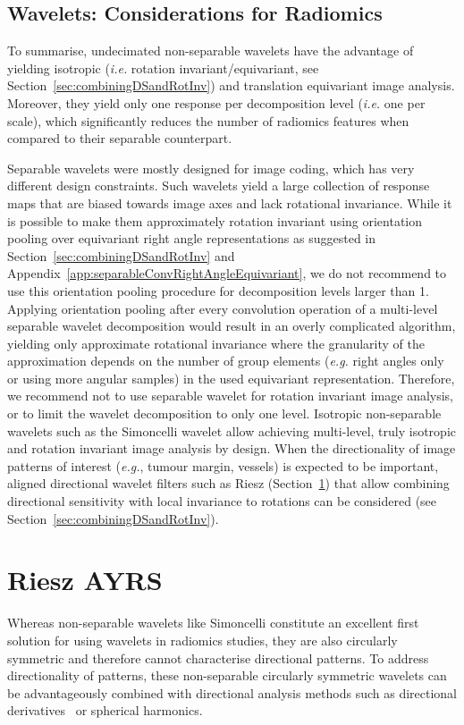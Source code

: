 \documentclass[fleqn,a4paper,oneside,openany]{book}
\newcommand\id[1]{{\hfill\normalsize{\idfont #1}}}
\renewcommand{\marginnote}[2][]{}
\begin{document}
\subsection{Wavelets: Considerations for Radiomics}\label{sec:waveletConsiderations}
%
To summarise, undecimated non-separable wavelets have the advantage of yielding isotropic (\textit{i.e.} rotation invariant/equivariant, see Section~\ref{sec:combiningDSandRotInv}) and translation equivariant image analysis. Moreover, they yield only one response per decomposition level (\textit{i.e.} one per scale), which significantly reduces the number of radiomics features when compared to their separable counterpart.
%
\marginnote{\footnotesize v4: Added recommendation to not perform decomposition using separable wavelets beyond the first level.}
Separable wavelets were mostly designed for image coding, which has very different design constraints.
Such wavelets yield a large collection of response maps that are biased towards image axes and lack rotational invariance.
While it is possible to make them approximately rotation invariant using orientation pooling over equivariant right angle representations as suggested in Section~\ref{sec:combiningDSandRotInv} and Appendix~\ref{app:separableConvRightAngleEquivariant}, we do not recommend to use this orientation pooling procedure for decomposition levels larger than 1.
Applying orientation pooling after every convolution operation of a multi-level separable wavelet decomposition would result in an overly complicated algorithm, yielding only approximate rotational invariance where the granularity of the approximation depends on the number of group elements (\emph{e.g.} right angles only or using more angular samples) in the used equivariant representation.
Therefore, we recommend not to use separable wavelet for rotation invariant image analysis, or to limit the wavelet decomposition to only one level.
Isotropic non-separable wavelets such as the Simoncelli wavelet allow achieving multi-level, truly isotropic and rotation invariant image analysis by design.
When the directionality of image patterns of interest (\textit{e.g.}, tumour margin, vessels) is expected to be important, aligned directional wavelet filters such as Riesz (Section~\ref{sec:Riesz}) that allow combining directional sensitivity with local invariance to rotations can be considered (see Section~\ref{sec:combiningDSandRotInv}).
%

\section[Riesz]{Riesz \id{AYRS}}\label{sec:Riesz}
%
\marginnote{\footnotesize v4: Extended description of the Riesz transform.}
Whereas non-separable wavelets like Simoncelli constitute an excellent first solution for using wavelets in radiomics studies, they are also circularly symmetric and therefore cannot characterise directional patterns.
To address directionality of patterns, these non-separable circularly symmetric wavelets can be advantageously combined with directional analysis methods such as directional derivatives~\cite{Prasanna2014} or spherical harmonics.
\end{document}

